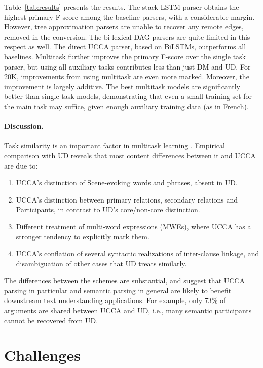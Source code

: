 \documentclass[12pt]{report}
\begin{document}
Table~\ref{tab:results} presents the results.
The stack LSTM parser obtains the highest primary F-score
among the baseline parsers, with a considerable margin. However,
tree approximation parsers are unable to recover any remote edges,
removed in the conversion.
The bi-lexical DAG parsers are quite limited in this respect as well.
The direct UCCA parser, based on BiLSTMs, outperforms all baselines.
Multitask further improves the primary F-score over the single task parser,
but using all auxiliary tasks contributes less than just DM and UD.
For 20K, improvements from using multitask are even more marked. 
Moreover, the improvement is largely additive.
The best multitask models are significantly better than single-task models,
demonstrating that even a small training set for the main task may suffice,
given enough auxiliary training data (as in French).

\paragraph{Discussion.}

Task similarity is an important factor in multitask learning
\cite{E17-2026,E17-1005}.
Empirical comparison with UD reveals that most content differences between it and UCCA are due to:
  \begin{enumerate}
      \item UCCA's distinction of Scene-evoking words and phrases, absent in UD.
      \item UCCA's distinction between primary relations, secondary relations
        and Participants, in contrast to UD's core/non-core distinction.
      \item Different treatment of multi-word expressions (MWEs),
        where UCCA has a stronger tendency to explicitly mark them.
      \item UCCA's conflation of several syntactic realizations of inter-clause linkage,
        and disambiguation of other cases that UD treats similarly.
   \end{enumerate}

  The differences between the schemes are substantial, and suggest that
  UCCA parsing in particular and semantic parsing in general are likely to benefit
  downstream text understanding applications.
  For example, only 73\% of arguments are shared between UCCA and UD,
  i.e., many semantic participants cannot be recovered from UD.


\section{Challenges}\label{sec:challenges}
\end{document}
